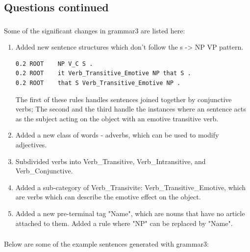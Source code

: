 \documentclass[11pt]{article}
\begin{document}
\subsection{Questions continued}

\subsubsection{}

Some of the significant changes in grammar3 are listed here:

\begin{enumerate}[label=(\arabic*)]
      \item Added new sentence structures which don't follow the s -> NP VP pattern. 
      
\begin{verbatim}
0.2 ROOT    NP V_C S .
0.2 ROOT    it Verb_Transitive_Emotive NP that S .
0.2 ROOT    that S Verb_Transitive_Emotive NP .
\end{verbatim}
      The first of these rules handles sentences joined together by conjunctive verbs; The second and the third handle the instances where an sentence acts as the subject acting on the object with an emotive transitive verb.
      \item Added a new class of words - adverbs, which can be used to modify adjectives.
      \item Subdivided verbs into Verb\_Transitive, Verb\_Intransitive, and Verb\_Conjunctive.
      \item Added a sub-category of Verb\_Transivite: Verb\_Transitive\_Emotive, which are verbs which can describe the emotive effect on the object.
      \item Added a new pre-terminal tag "Name", which are nouns that have no article attached to them. Added a rule where "NP" can be replaced by "Name".
\end{enumerate}

\subsubsection{}

Below are some of the example sentences generated with grammar3:
\end{document}
